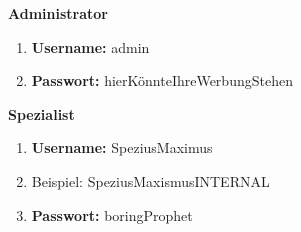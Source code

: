 \textbf{Administrator}
\begin{enumerate}
	\item{\textbf{Username:} admin}
	\item{\textbf{Passwort:} hierKönnteIhreWerbungStehen}
\end{enumerate}

\textbf{Spezialist}
\begin{enumerate}
	\item{\textbf{Username:} SpeziusMaximus}
	\item[]{Beispiel: SpeziusMaxismus\textunderscore{}INTERNAL}
	\item{\textbf{Passwort:} boringProphet}
\end{enumerate}
